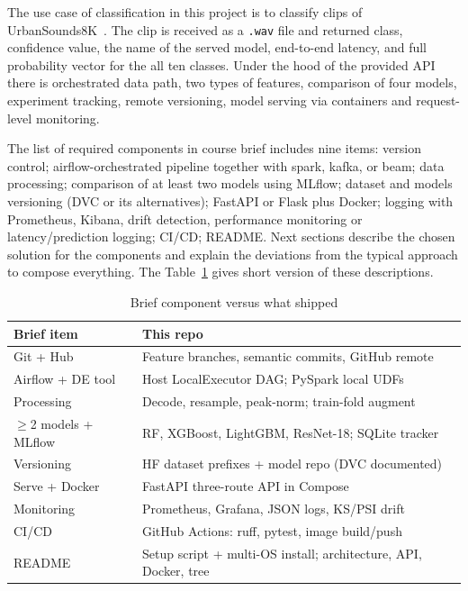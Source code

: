\documentclass[conference]{IEEEtran}
\begin{document}
The use case of classification in this project is to classify clips of UrbanSounds8K~\cite{salamon2014urbansound}.
The clip is received as a \texttt{.wav} file and returned class, confidence value, the name of the served model, end-to-end latency, and full probability vector for the all ten classes.
Under the hood of the provided API there is orchestrated data path, two types of features, comparison of four models, experiment tracking, remote versioning, model serving via containers and request-level monitoring.

The list of required components in course brief includes nine items: version control; airflow-orchestrated pipeline together with spark, kafka, or beam; data processing; comparison of at least two models using MLflow; dataset and models versioning (DVC or its alternatives); FastAPI or Flask plus Docker; logging with Prometheus, Kibana, drift detection, performance monitoring or latency/prediction logging; CI/CD; README.
Next sections describe the chosen solution for the components and explain the deviations from the typical approach to compose everything.
The Table~\ref{tab:brief} gives short version of these descriptions.

\begin{table}[!t]
  \renewcommand{\arraystretch}{1.12}
  \setlength{\tabcolsep}{2.5pt}
  \caption{Brief component versus what shipped}
  \label{tab:brief}
  \centering
  \begin{tabular}{>{\raggedright\arraybackslash}p{}
    >{\raggedright\arraybackslash}p{}}
    \toprule
    Brief item & This repo \\
    \midrule
    Git + Hub & Feature branches, semantic commits, GitHub remote \\
    Airflow + DE tool & Host LocalExecutor DAG; PySpark local UDFs \\
    Processing & Decode, resample, peak-norm; train-fold augment \\
    \(\geq\)2 models + MLflow & RF, XGBoost, LightGBM, ResNet-18; SQLite tracker \\
    Versioning & HF dataset prefixes + model repo (DVC documented) \\
    Serve + Docker & FastAPI three-route API in Compose \\
    Monitoring & Prometheus, Grafana, JSON logs, KS/PSI drift \\
    CI/CD & GitHub Actions: ruff, pytest, image build/push \\
    README & Setup script + multi-OS install; architecture, API, Docker, tree \\
    \bottomrule
  \end{tabular}
\end{table}
\end{document}
